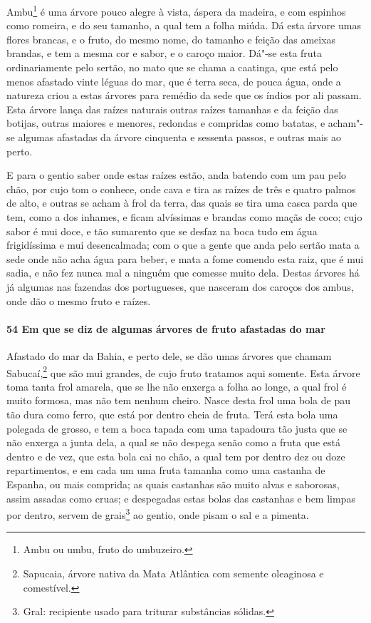 Ambu\footnote{ Ambu ou umbu, fruto do umbuzeiro.} é uma árvore pouco alegre à vista,
áspera da madeira, e com espinhos como romeira, e do seu tamanho, a qual tem a folha
miúda. Dá esta árvore umas flores brancas, e o fruto, do mesmo nome, do tamanho e feição
das ameixas brandas, e tem a mesma cor e sabor, e o caroço maior. Dá"-se esta fruta
ordinariamente pelo sertão, no mato que se chama a caatinga, que está pelo menos afastado
vinte léguas do mar, que é terra seca, de pouca água, onde a natureza criou a estas
árvores para remédio da sede que os índios por ali passam. Esta árvore lança das raízes
naturais outras raízes tamanhas e da feição das botijas, outras maiores e menores,
redondas e compridas como batatas, e acham"-se algumas afastadas da árvore cinquenta e
sessenta passos, e outras mais ao perto.

E para o gentio saber onde estas raízes estão, anda batendo com um pau pelo chão, por cujo
tom o conhece, onde cava e tira as raízes de três e quatro palmos de alto, e outras se
acham à frol da terra, das quais se tira uma casca parda que tem, como a dos inhames, e
ficam alvíssimas e brandas como maçãs de coco; cujo sabor é mui doce, e tão sumarento que
se desfaz na boca tudo em água frigidíssima e mui desencalmada; com o que a gente que anda
pelo sertão mata a sede onde não acha água para beber, e mata a fome comendo esta raiz,
que é mui sadia, e não fez nunca mal a ninguém que comesse muito dela. Destas árvores há
já algumas nas fazendas dos portugueses, que nasceram dos caroços dos ambus, onde dão o
mesmo fruto e raízes.

\paragraph{54 Em que se diz de algumas árvores de fruto afastadas do mar}

Afastado do mar da Bahia, e perto dele, se dão umas árvores que chamam Sabucaí,\footnote{
Sapucaia, árvore nativa da Mata Atlântica com semente oleaginosa e comestível.} que são
mui grandes, de cujo fruto tratamos aqui somente. Esta árvore toma tanta frol amarela, que
se lhe não enxerga a folha ao longe, a qual frol é muito formosa, mas não tem nenhum
cheiro. Nasce desta frol uma bola de pau tão dura como ferro, que está por dentro cheia de
fruta. Terá esta bola uma polegada de grosso, e tem a boca tapada com uma tapadoura tão
justa que se não enxerga a junta dela, a qual se não despega senão como a fruta que está
dentro e de vez, que esta bola cai no chão, a qual tem por dentro dez ou doze
repartimentos, e em cada um uma fruta tamanha como uma castanha de Espanha, ou mais
comprida; as quais castanhas são muito alvas e saborosas, assim assadas como cruas; e
despegadas estas bolas das castanhas e bem limpas por dentro, servem de grais\footnote{
Gral: recipiente usado para triturar substâncias sólidas.} ao gentio, onde pisam o sal e a
pimenta.

